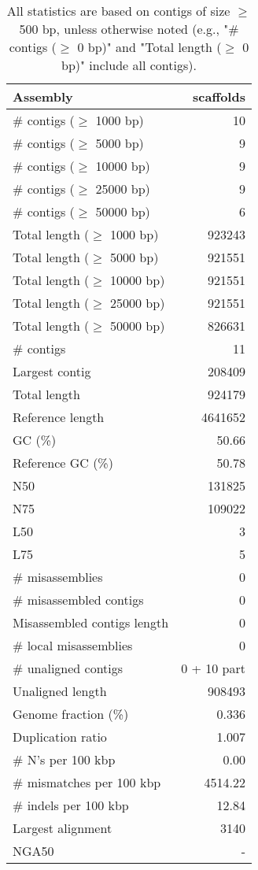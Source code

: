\documentclass[12pt,a4paper]{article}
\begin{document}
\begin{table}[ht]
\begin{center}
\caption{All statistics are based on contigs of size $\geq$ 500 bp, unless otherwise noted (e.g., "\# contigs ($\geq$ 0 bp)" and "Total length ($\geq$ 0 bp)" include all contigs).}
\begin{tabular}{|l*{1}{|r}|}
\hline
Assembly & scaffolds \\ \hline
\# contigs ($\geq$ 1000 bp) & 10 \\ \hline
\# contigs ($\geq$ 5000 bp) & 9 \\ \hline
\# contigs ($\geq$ 10000 bp) & 9 \\ \hline
\# contigs ($\geq$ 25000 bp) & 9 \\ \hline
\# contigs ($\geq$ 50000 bp) & 6 \\ \hline
Total length ($\geq$ 1000 bp) & 923243 \\ \hline
Total length ($\geq$ 5000 bp) & 921551 \\ \hline
Total length ($\geq$ 10000 bp) & 921551 \\ \hline
Total length ($\geq$ 25000 bp) & 921551 \\ \hline
Total length ($\geq$ 50000 bp) & 826631 \\ \hline
\# contigs & 11 \\ \hline
Largest contig & 208409 \\ \hline
Total length & 924179 \\ \hline
Reference length & 4641652 \\ \hline
GC (\%) & 50.66 \\ \hline
Reference GC (\%) & 50.78 \\ \hline
N50 & 131825 \\ \hline
N75 & 109022 \\ \hline
L50 & 3 \\ \hline
L75 & 5 \\ \hline
\# misassemblies & 0 \\ \hline
\# misassembled contigs & 0 \\ \hline
Misassembled contigs length & 0 \\ \hline
\# local misassemblies & 0 \\ \hline
\# unaligned contigs & 0 + 10 part \\ \hline
Unaligned length & 908493 \\ \hline
Genome fraction (\%) & 0.336 \\ \hline
Duplication ratio & 1.007 \\ \hline
\# N's per 100 kbp & 0.00 \\ \hline
\# mismatches per 100 kbp & 4514.22 \\ \hline
\# indels per 100 kbp & 12.84 \\ \hline
Largest alignment & 3140 \\ \hline
NGA50 & - \\ \hline
\end{tabular}
\end{center}
\end{table}
\end{document}
